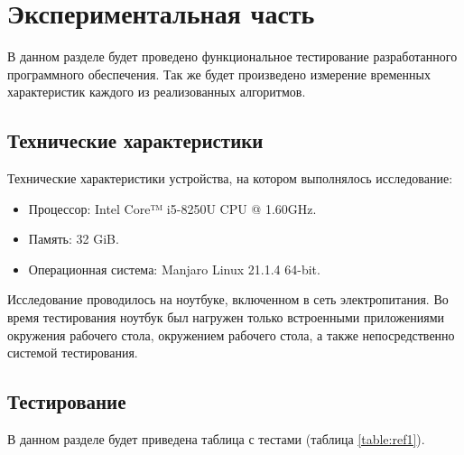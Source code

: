 \chapter{Экспериментальная часть}

В данном разделе будет проведено функциональное тестирование разработанного программного обеспечения. Так же будет произведено измерение временных характеристик каждого из реализованных алгоритмов. 

\section{Технические характеристики}

Технические характеристики устройства, на котором выполнялось исследование:

\begin{itemize}
	\item Процессор: Intel Core™ i5-8250U \cite{i5} CPU @ 1.60GHz.
	\item Память: 32 GiB.
	\item Операционная система: Manjaro \cite{manjaro} Linux \cite{linux} 21.1.4 64-bit.

\end{itemize}

Исследование проводилось на ноутбуке, включенном в сеть электропитания. Во время тестирования ноутбук был нагружен только встроенными приложениями окружения рабочего стола, окружением рабочего стола, а также непосредственно системой тестирования.

\section{Тестирование}

В данном разделе будет приведена таблица с тестами (таблица \ref{table:ref1}).

